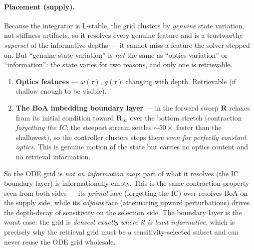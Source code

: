\documentclass[11pt,a4paper]{article}
\newcommand{\mat}[1]{\mathbf{#1}}
\theoremstyle{definition}
\begin{document}
\paragraph{Placement (supply).}  Because the integrator is L-stable, the
grid clusters by \emph{genuine} state variation, not stiffness artifacts,
so it resolves every genuine feature and is a trustworthy \emph{superset}
of the informative depths --- it cannot miss a feature the solver stepped
on.  But ``genuine state variation'' is \emph{not} the same as ``optics
variation'' or ``information'': the state varies for two reasons, and
only one is retrievable.
\begin{enumerate}[nosep]
  \item \textbf{Optics features} --- $\omega(\tau)$, $g(\tau)$ changing
    with depth.  Retrievable (if shallow enough to be visible).
  \item \textbf{The BoA imbedding boundary layer} --- in the forward
    sweep $\mat{R}$ relaxes from its initial condition toward
    $\mat{R}_\infty$ over the bottom stretch (contraction \emph{forgetting
    the IC}; the steepest stream settles ${\sim}50\times$ faster than the
    shallowest), so the controller clusters steps there \emph{even for
    perfectly constant optics}.  This is genuine motion of the state but
    carries no optics content and no retrieval information.
\end{enumerate}

So the ODE grid is \emph{not an information map}: part of what it resolves
(the IC boundary layer) is informationally empty.  This is the same
contraction property seen from both sides --- its \emph{primal} face
(forgetting the IC) over-resolves BoA on the supply side, while its
\emph{adjoint} face (attenuating upward perturbations) drives the
depth-decay of sensitivity on the selection side.  The boundary layer is
the worst case: the grid is \emph{densest exactly where it is least
informative}, which is precisely why the retrieval grid must be a
sensitivity-selected subset and can never reuse the ODE grid wholesale.
\end{document}
